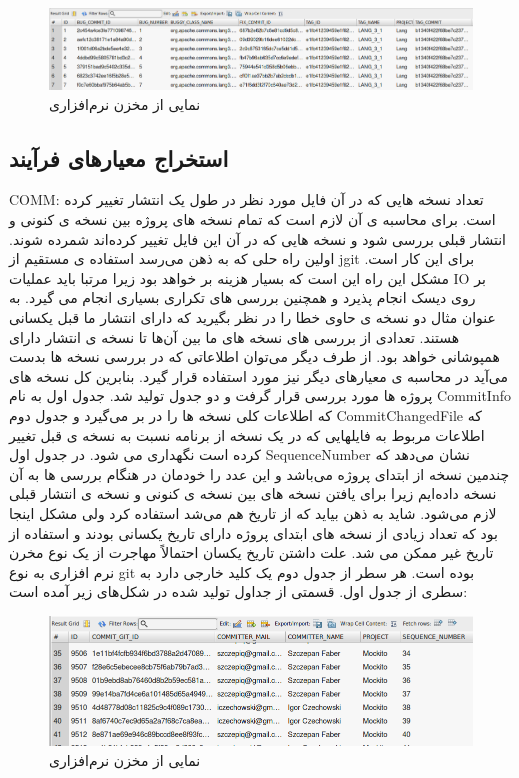 \begin{figure}[H]
\centering
\includegraphics[width=1\textwidth]{img/case_study/bug-info.png}
\caption{نمایی از مخزن نرم‌افزاری}
\label{fig:bug-info}
\end{figure}


\subsection{ استخراج معیارهای فرآیند}

COMM: تعداد نسخه هایی که در آن فایل مورد نظر در طول یک انتشار تغییر کرده است. برای محاسبه ی آن لازم است که تمام نسخه های پروژه بین نسخه ی کنونی و انتشار قبلی بررسی شود و نسخه هایی که در آن این فایل تغییر کرده‌اند شمرده شوند. اولین راه حلی که به ذهن می‌رسد استفاده ی مستقیم از jgit برای این کار است. مشکل این راه این است که بسیار هزینه بر خواهد بود زیرا مرتبا باید عملیات IO بر روی دیسک انجام پذیرد و همچنین بررسی های تکراری بسیاری انجام می گیرد. به عنوان مثال دو نسخه ی حاوی خطا را در نظر بگیرید که دارای انتشار ما قبل یکسانی هستند. تعدادی از بررسی های نسخه های ما بین آن‌ها تا نسخه ی انتشار دارای همپوشانی خواهد بود. از طرف دیگر می‌توان اطلاعاتی که در بررسی نسخه ها بدست می‌آید در محاسبه ی معیارهای دیگر نیز مورد استفاده قرار گیرد. بنابرین کل نسخه های پروژه ها مورد بررسی قرار گرفت و دو جدول تولید شد. 
جدول اول به نام CommitInfo‌ که اطلاعات کلی نسخه ها را در بر می‌گیرد و جدول دوم  CommitChangedFile که اطلاعات مربوط به فایلهایی که در یک نسخه از برنامه نسبت به نسخه ی قبل تغییر کرده است نگهداری می شود. در جدول اول SequenceNumber نشان می‌دهد که چندمین نسخه از ابتدای پروژه می‌باشد و این عدد را خودمان در هنگام بررسی ها به آن نسخه داده‌ایم زیرا برای یافتن نسخه های بین نسخه ی کنونی و نسخه ی انتشار قبلی لازم می‌شود. شاید به ذهن بیاید که از تاریخ هم می‌شد استفاده کرد ولی مشکل اینجا بود که تعداد زیادی از نسخه های ابتدای پروژه دارای تاریخ یکسانی بودند و استفاده از تاریخ غیر ممکن می شد. علت داشتن تاریخ یکسان احتمالاً مهاجرت از یک نوع مخرن نرم افزاری به نوع git بوده است.   هر سطر از جدول دوم یک کلید خارجی دارد به سطری از جدول اول. قسمتی از جداول تولید شده در شکل‌های  زیر آمده است:

\begin{figure}[H]
	\centering
	\includegraphics[width=1\textwidth]{img/case_study/commit-info.png}
	\caption{نمایی از مخزن نرم‌افزاری}
	\label{fig:commit-info}
\end{figure}


